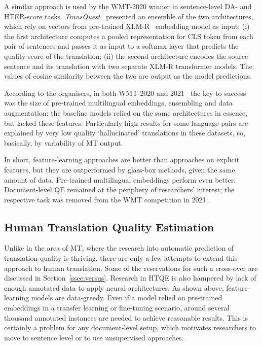 A similar approach is used by the WMT-2020 winner in sentence-level DA- and HTER-score tasks. \textit{TransQuest}~\cite{Ranasinghe2020} presented an ensemble of the two architectures, which rely on vectors from pre-trained \gls{XLM-R}~\cite{Conneau2020} embedding model as input: (i) the first architecture computes a pooled representation for CLS token from each pair of sentences and passes it as input to a softmax layer that predicts the quality score of the translation; (ii) the second architecture encodes the source sentence and its translation with two separate XLM-R transformer models. The values of cosine similarity between the two are output as the model predictions.

According to the organisers, in both WMT-2020 and 2021~\cite{Specia2020wmt, Specia2021wmt} the key to success was the size of pre-trained multilingual embeddings, ensembling and data augmentation: the baseline models relied on the same architectures in essence, but lacked these features. Particularly high results for some language pairs are explained by very low quality `hallucinated' translations in these datasets, so, basically, by variability of MT output.   

In short, feature-learning approaches are better than approaches on explicit features, but they are outperformed by glass-box methods, given the same amount of data. Pre-trained multilingual embeddings perform even better. Document-level QE remained at the periphery of researchers' interest; the respective task was removed from the WMT competition in 2021.

\subsection{\label{ssec:htqe}Human Translation Quality Estimation}

Unlike in the area of MT, where the research into automatic prediction of translation quality is thriving, there are only a few attempts to extend this approach to human translation. Some of the reservations for such a cross-over are discussed in Section~\ref{ssec:versus}. Research in HTQE is also hampered by lack of enough annotated data to apply neural architectures. As shown above, feature-learning models are data-greedy. Even if a model relied on pre-trained embeddings in a transfer learning or fine-tuning scenario, around several thousand annotated instances are needed to achieve reasonable results. This is certainly a problem for any document-level setup, which motivates researchers to move to sentence level or to use unsupervised approaches.
 
